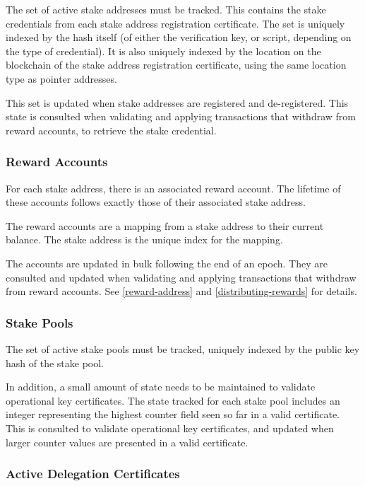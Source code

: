 \documentclass[11pt,a4paper,dvipsnames,twosided]{article}
\begin{document}
The set of active stake addresses must be tracked. This contains the stake
credentials from each stake address registration certificate. The set is
uniquely indexed by the hash itself (of either the verification key, or script,
depending on the type of credential). It is also uniquely indexed by the
location on the blockchain of the stake address registration certificate, using
the same location type as pointer addresses.

This set is updated when stake addresses are registered and de-registered. This
state is consulted when validating and applying transactions that withdraw from
reward accounts, to retrieve the stake credential.

\subsubsection{Reward Accounts}
\label{reward-accounts}

For each stake address, there is an associated reward account. The lifetime of
these accounts follows exactly those of their associated stake address.

The reward accounts are a mapping from a stake address to their current balance.
The stake address is the unique index for the mapping.

The accounts are updated in bulk following the end of an epoch. They are
consulted and updated when validating and applying transactions that withdraw
from reward accounts. See \cref{reward-address} and \cref{distributing-rewards}
for details.

\subsubsection{Stake Pools}
\label{stake-pools}

The set of active stake pools must be tracked, uniquely indexed
by the public key hash of the stake pool.

In addition, a small amount of state needs to be maintained to validate
operational key certificates. The state tracked for each stake pool includes
an integer representing the highest counter field seen so far in a valid
certificate. This is consulted to validate operational key certificates, and
updated when larger counter values are presented in a valid certificate.

\subsubsection{Active Delegation Certificates}
\label{active-delegation-certificates}
\end{document}

